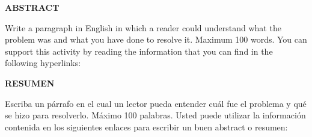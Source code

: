 \vspace*{0.2cm}
\begin{center}
    \fontsize{14pt}{14pt}\textbf{ABSTRACT}\\
\end{center}
\vspace*{0.2cm}
\noindent Write a paragraph in English in which a reader could understand what the problem was and what you have done to resolve it. Maximum 100 words.  You can support this activity by reading the information that you can find in the following hyperlinks:
\vspace*{1.5cm}
\begin{center}
    \fontsize{14pt}{14pt}\textbf{RESUMEN}\\
\end{center}
\vspace*{0.2cm}
\noindent Escriba un párrafo en el cual un lector pueda entender cuál fue el problema y qué se hizo para resolverlo. Máximo 100 palabras. Usted puede utilizar la información contenida en los siguientes enlaces para escribir un buen abstract o resumen:
